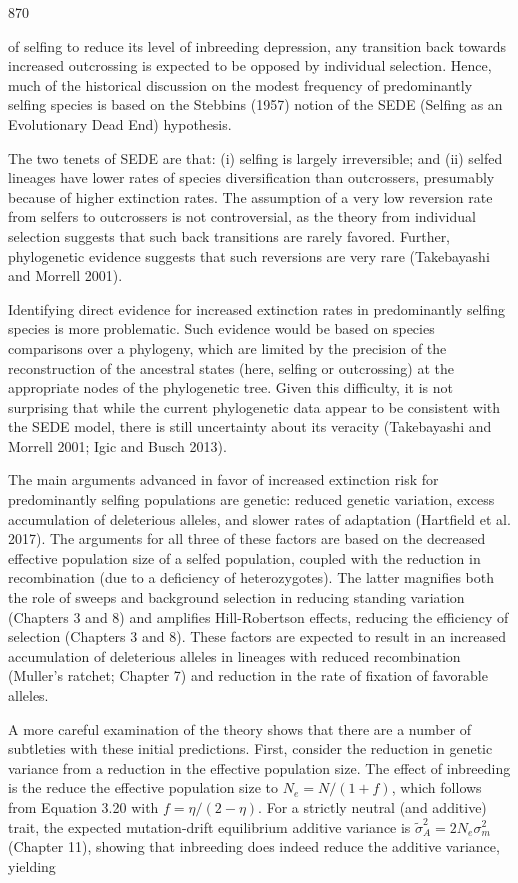 \documentclass{article}
\begin{document}
870

of selfing to reduce its level of inbreeding depression, any transition back towards increased outcrossing is expected to be opposed by individual selection. Hence, much of the historical discussion on the modest frequency of predominantly selfing species is based on the Stebbins (1957) notion of the SEDE (Selfing as an Evolutionary Dead End) hypothesis.

The two tenets of SEDE are that: (i) selfing is largely irreversible; and (ii) selfed lineages have lower rates of species diversification than outcrossers, presumably because of higher extinction rates. The assumption of a very low reversion rate from selfers to outcrossers is not controversial, as the theory from individual selection suggests that such back transitions are rarely favored. Further, phylogenetic evidence suggests that such reversions are very rare (Takebayashi and Morrell 2001).

Identifying direct evidence for increased extinction rates in predominantly selfing species is more problematic. Such evidence would be based on species comparisons over a phylogeny, which are limited by the precision of the reconstruction of the ancestral states (here, selfing or outcrossing) at the appropriate nodes of the phylogenetic tree. Given this difficulty, it is not surprising that while the current phylogenetic data appear to be consistent with the SEDE model, there is still uncertainty about its veracity (Takebayashi and Morrell 2001; Igic and Busch 2013).

The main arguments advanced in favor of increased extinction risk for predominantly selfing populations are genetic: reduced genetic variation, excess accumulation of deleterious alleles, and slower rates of adaptation (Hartfield et al. 2017). The arguments for all three of these factors are based on the decreased effective population size of a selfed population, coupled with the reduction in recombination (due to a deficiency of heterozygotes). The latter magnifies both the role of sweeps and background selection in reducing standing variation (Chapters 3 and 8) and amplifies Hill-Robertson effects, reducing the efficiency of selection (Chapters 3 and 8). These factors are expected to result in an increased accumulation of deleterious alleles in lineages with reduced recombination (Muller's ratchet; Chapter 7) and reduction in the rate of fixation of favorable alleles.

A more careful examination of the theory shows that there are a number of subtleties with these initial predictions. First, consider the reduction in genetic variance from a reduction in the effective population size. The effect of inbreeding is the reduce the effective population size to  $ N_e = N/(1 + f) $, which follows from Equation 3.20 with  $ f = \eta/(2 - \eta) $. For a strictly neutral (and additive) trait, the expected mutation-drift equilibrium additive variance is  $ \widetilde{\sigma}_A^2 = 2N_e \sigma_m^2 $ (Chapter 11), showing that inbreeding does indeed reduce the additive variance, yielding
\end{document}
